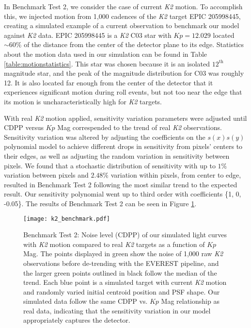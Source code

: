 \documentclass[12pt,preprint]{aastex}
\begin{document}
In Benchmark Test 2, we consider the case of current \textit{K2} motion. To accomplish this, we injected motion from 1,000 cadences of the \textit{K2} target EPIC 205998445, creating a simulated example of a current observation to benchmark our model against \textit{K2} data. EPIC 205998445 is a \textit{K2} C03 star with $Kp = 12.029$ located ${\sim}60\%$ of the distance from the center of the detector plane to its edge. Statistics about the motion data used in our simulation can be found in Table \ref{table:motionstatistics}. This star was chosen because it is an isolated $12^{\text{th}}$ magnitude star, and the peak of the magnitude distribution for C03 was roughly 12. It is also located far enough from the center of the detector that it experiences significant motion during roll events, but not too near the edge that its motion is uncharacteristically high for \textit{K2} targets.

With real \textit{K2} motion applied, sensitivity variation parameters were adjusted until CDPP versus $Kp$ Mag correspended to the trend of real \textit{K2} observations. Sensitivity variation was altered by adjusting the coefficients on the $s(x)s(y)$ polynomial model to achieve different drops in sensitivity from pixels' centers to their edges, as well as adjusting the random variation in sensitivity between pixels. We found that a stochastic distribution of sensitivity with up to $1\%$ variation between pixels and $2.48\%$ variation within pixels, from center to edge, resulted in Benchmark Test 2 following the most similar trend to the expected result. Our sensitivity polynomial went up to third order with coefficients \{1, 0, -0.05\}. The results of Benchmark Test 2 can be seen in Figure \ref{fig:1motion}.

\begin{figure}[h]
	\centering
	\texttt{[image: k2\_benchmark.pdf]}
	\caption{Benchmark Test 2: Noise level (CDPP) of our simulated light curves with \textit{K2} motion compared to real \textit{K2} targets as a function of $Kp$ Mag. The points displayed in green show the noise of 1,000 raw \textit{K2} observations before de-trending with the EVEREST pipeline, and the larger green points outlined in black follow the median of the trend. Each blue point is a simulated target with current \textit{K2} motion and randomly varied initial centroid position and PSF shape. Our simulated data follow the same CDPP vs. $Kp$ Mag relationship as real data, indicating that the sensitivity variation in our model appropriately captures the detector.}
	\label{fig:1motion}
\end{figure}
\end{document}
